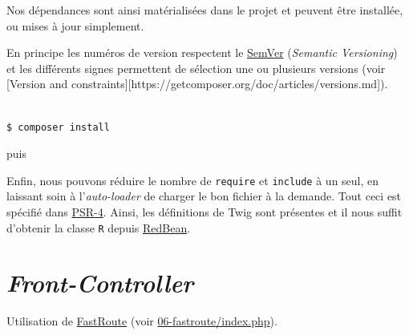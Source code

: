 Nos dépendances sont ainsi matérialisées dans le projet et peuvent être
installée, ou mises à jour simplement.

En principe les numéros de version respectent le
\href{http://semver.org/lang/fr/}{SemVer} (\emph{Semantic Versioning})
et les différents signes permettent de sélection une ou plusieurs
versions (voir {[}Version and
constraints{]}{[}https://getcomposer.org/doc/articles/versions.md{]}).

\begin{english}

\begin{verbatim}

$ composer install
\end{verbatim}

\end{english}

puis

\begin{english}

\begin{Shaded}
\begin{Highlighting}[]
 

 \OtherTok{;}

 \OtherTok{;}
\end{Highlighting}
\end{Shaded}

\end{english}

Enfin, nous pouvons réduire le nombre de \textenglish{\texttt{require}}
et \textenglish{\texttt{include}} à un seul, en laissant soin à
l'\emph{auto-loader} de charger le bon fichier à la demande. Tout ceci
est spécifié dans \href{http://www.php-fig.org/psr/psr-4/}{PSR-4}.
Ainsi, les définitions de Twig sont présentes et il nous suffit
d'obtenir la classe \textenglish{\texttt{R}} depuis
\href{http://www.redbeanphp.com/}{RedBean}.

\hypertarget{front-controller}{%
\section{\texorpdfstring{\emph{Front-Controller}}{Front-Controller}}\label{front-controller}}

Utilisation de \href{https://github.com/nikic/FastRoute}{FastRoute}
(voir
\href{https://github.com/HE-Arc/php-intro-framework/blob/master/06-fastroute/index.php}{06-fastroute/index.php}).

